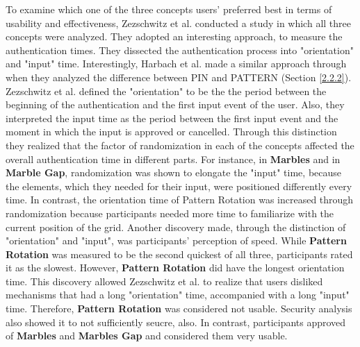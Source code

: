 To examine which one of the three concepts users' preferred best in terms of usability and effectiveness, Zezschwitz et al. \cite{Marbles} conducted a study in which all three concepts were analyzed. They adopted an interesting approach, to measure the authentication times. They dissected the authentication process into "orientation" and "input" time. Interestingly, Harbach et al. \cite{AnatomySmartphone} made a similar approach through when they analyzed the difference between PIN and PATTERN (Section \ref{2.2.2}). Zezschwitz et al. \cite{Marbles} defined the "orientation" to be the the period between the beginning of the authentication and the first input event of the user. Also, they interpreted the input time as the period between the first input event and the moment in which the input is approved or cancelled. Through this distinction they realized that the factor of randomization in each of the concepts affected the overall authentication time in different parts. For instance, in \textbf{Marbles} and in \textbf{Marble Gap}, randomization was shown to elongate the "input" time, because the elements, which they needed for their input, were positioned differently every time. In contrast, the orientation time of Pattern Rotation was increased through randomization because participants needed more time to familiarize with the current position of the grid. Another discovery made, through the distinction of "orientation" and "input", was participants' perception of speed. While \textbf{Pattern Rotation} was measured to be the second quickest of all three, participants rated it as the slowest. However, \textbf{Pattern Rotation} did have the longest orientation time. This discovery allowed Zezschwitz et al. \cite{Marbles} to realize that users disliked mechanisms that had a long "orientation" time, accompanied with a long "input" time. Therefore, \textbf{Pattern Rotation} was considered not usable. Security analysis also showed it to not sufficiently seucre, also. In contrast, participants approved of \textbf{Marbles} and \textbf{Marbles Gap} and considered them very usable.\\


